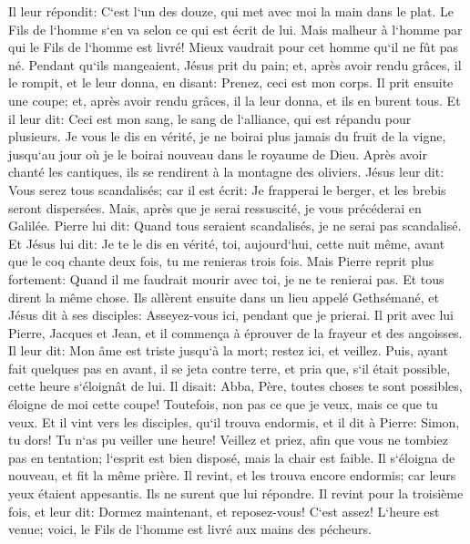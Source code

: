 \verse Il leur répondit: C`est l`un des douze, qui met avec moi la main dans le plat. 
\verse Le Fils de l`homme s`en va selon ce qui est écrit de lui. Mais malheur à l`homme par qui le Fils de l`homme est livré! Mieux vaudrait pour cet homme qu`il ne fût pas né. 
\verse Pendant qu`ils mangeaient, Jésus prit du pain; et, après avoir rendu grâces, il le rompit, et le leur donna, en disant: Prenez, ceci est mon corps. 
\verse Il prit ensuite une coupe; et, après avoir rendu grâces, il la leur donna, et ils en burent tous. 
\verse Et il leur dit: Ceci est mon sang, le sang de l`alliance, qui est répandu pour plusieurs. 
\verse Je vous le dis en vérité, je ne boirai plus jamais du fruit de la vigne, jusqu`au jour où je le boirai nouveau dans le royaume de Dieu. 
\verse Après avoir chanté les cantiques, ils se rendirent à la montagne des oliviers. 
\verse Jésus leur dit: Vous serez tous scandalisés; car il est écrit: Je frapperai le berger, et les brebis seront dispersées. 
\verse Mais, après que je serai ressuscité, je vous précéderai en Galilée. 
\verse Pierre lui dit: Quand tous seraient scandalisés, je ne serai pas scandalisé. 
\verse Et Jésus lui dit: Je te le dis en vérité, toi, aujourd`hui, cette nuit même, avant que le coq chante deux fois, tu me renieras trois fois. 
\verse Mais Pierre reprit plus fortement: Quand il me faudrait mourir avec toi, je ne te renierai pas. Et tous dirent la même chose. 
\verse Ils allèrent ensuite dans un lieu appelé Gethsémané, et Jésus dit à ses disciples: Asseyez-vous ici, pendant que je prierai. 
\verse Il prit avec lui Pierre, Jacques et Jean, et il commença à éprouver de la frayeur et des angoisses. 
\verse Il leur dit: Mon âme est triste jusqu`à la mort; restez ici, et veillez. 
\verse Puis, ayant fait quelques pas en avant, il se jeta contre terre, et pria que, s`il était possible, cette heure s`éloignât de lui. 
\verse Il disait: Abba, Père, toutes choses te sont possibles, éloigne de moi cette coupe! Toutefois, non pas ce que je veux, mais ce que tu veux. 
\verse Et il vint vers les disciples, qu`il trouva endormis, et il dit à Pierre: Simon, tu dors! Tu n`as pu veiller une heure! 
\verse Veillez et priez, afin que vous ne tombiez pas en tentation; l`esprit est bien disposé, mais la chair est faible. 
\verse Il s`éloigna de nouveau, et fit la même prière. 
\verse Il revint, et les trouva encore endormis; car leurs yeux étaient appesantis. Ils ne surent que lui répondre. 
\verse Il revint pour la troisième fois, et leur dit: Dormez maintenant, et reposez-vous! C`est assez! L`heure est venue; voici, le Fils de l`homme est livré aux mains des pécheurs. 
